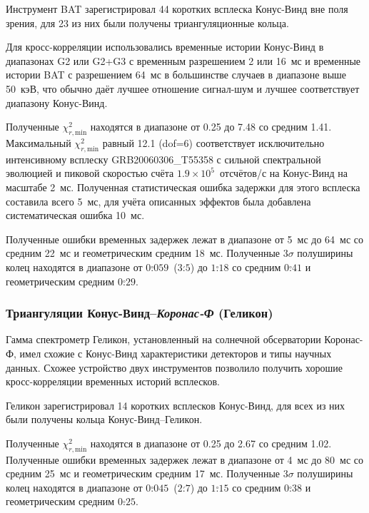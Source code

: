Инструмент BAT зарегистрировал 44 коротких всплеска Конус-Винд вне поля зрения, 
для 23 из них были получены триангуляционные кольца.

Для кросс-корреляции использовались временные истории Конус-Винд в диапазонах G2 
или G2+G3 с временным разрешением 2 или 16~мс и временные истории BAT с разрешением 
64~мс в большинстве случаев в диапазоне выше 50~кэВ, что обычно даёт лучшее 
отношение сигнал-шум и лучшее соответствует диапазону Конус-Винд.

Полученные $\chi^2_{r,\textrm{min}}$ находятся в диапазоне от 0.25 до 7.48 со 
средним 1.41. Максимальный $\chi^2_{r,\textrm{min}}$ равный 12.1 (dof=6) 
соответствует исключительно интенсивному всплеску GRB20060306\_T55358 с сильной 
спектральной эволюцией и пиковой скоростью счёта $1.9\times10^5$~отсчётов/с 
на Конус-Винд на масштабе 2~мс. Полученная статистическая ошибка задержки 
для этого всплеска составила всего 5~мс, для учёта описанных эффектов была 
добавлена систематическая ошибка 10~мс.

Полученные ошибки временных задержек лежат в диапазоне от 5~мс до 64~мс со 
средним 22~мс и геометрическим средним 18~мс. Полученные $3\sigma$ полуширины 
колец находятся в диапазоне от $0\overset{\circ}{.}059$~($3\overset{\prime}{.}5$) 
до $1\overset{\circ}{.}18$ со средним $0\overset{\circ}{.}41$ 
и геометрическим средним $0\overset{\circ}{.}29$.

\subsubsection{Триангуляции Конус-Винд--\textit{Коронас-Ф} (Геликон)}
Гамма спектрометр Геликон, установленный на солнечной обсерватории Коронас-Ф, 
имел схожие с  Конус-Винд характеристики детекторов и типы научных данных. 
Схожее устройство двух инструментов позволило получить хорошие кросс-корреляции 
временных историй всплесков.

Геликон зарегистрировал 14 коротких всплесков Конус-Винд, для всех из них были 
получены кольца Конус-Винд--Геликон.

Полученные $\chi^2_{r,\textrm{min}}$ находятся в диапазоне от 0.25 до 2.67 со средним 1.02. 
Полученные ошибки временных задержек лежат в диапазоне от 4~мс до 80~мс со средним 25~мс 
и геометрическим средним 17~мс. Полученные $3\sigma$ полуширины колец находятся 
в диапазоне от $0\overset{\circ}{.}045$~($2\overset{\prime}{.}7$) до $1\overset{\circ}{.}15$
со средним $0\overset{\circ}{.}38$ и геометрическим средним $0\overset{\circ}{.}25$.

